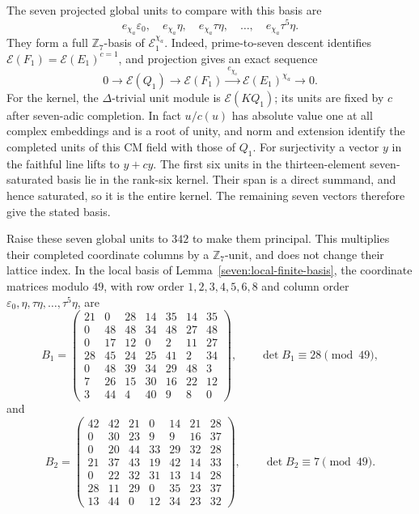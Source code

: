 The seven projected global units to compare with this basis are
\[
 e_{\chi_a}\varepsilon_0,\quad
 e_{\chi_a}\eta,\quad e_{\chi_a}\tau\eta,\quad\ldots,\quad
 e_{\chi_a}\tau^5\eta.
\]
They form a full $\mathbb Z_7$-basis of $\mathcal E_1^{\chi_a}$.
Indeed, prime-to-seven descent identifies
$\mathcal E(F_1)=\mathcal E(E_1)^{c=1}$, and projection gives an exact
sequence
\[
 0\longrightarrow\mathcal E(Q_1)
 \longrightarrow\mathcal E(F_1)
 \xrightarrow{\ e_{\chi_a}\ }\mathcal E(E_1)^{\chi_a}
 \longrightarrow0.
\]
For the kernel, the $\Delta$-trivial unit module is
$\mathcal E(KQ_1)$; its units are fixed by $c$ after seven-adic
completion. In fact $u/c(u)$ has absolute value one at all complex
embeddings and is a root of unity, and norm and extension identify
the completed units of this CM field with those of $Q_1$.
For surjectivity a vector $y$ in the faithful line lifts to $y+cy$.
The first six units in the thirteen-element seven-saturated basis
lie in the rank-six kernel. Their span is a direct summand, and hence
saturated, so it is the entire kernel. The remaining seven vectors
therefore give the stated basis.

Raise these seven global units to $342$ to make them principal.
This multiplies their completed coordinate columns by a
$\mathbb Z_7$-unit, and does not change their lattice index.
In the local basis of Lemma~\ref{seven:local-finite-basis}, the
coordinate matrices modulo $49$, with row order
$1,2,3,4,5,6,8$ and column order
$\varepsilon_0,\eta,\tau\eta,\ldots,\tau^5\eta$, are
\begin{equation*}\tag{U12}\label{seven:local-matrix-one}
 B_1=
 \begin{pmatrix}
 21&0&28&14&35&14&35\\
 0&48&48&34&48&27&48\\
 0&17&12&0&2&11&27\\
 28&45&24&25&41&2&34\\
 0&48&39&34&29&48&3\\
 7&26&15&30&16&22&12\\
 3&44&4&40&9&8&0
 \end{pmatrix},
 \qquad\det B_1\equiv28\pmod{49},
\end{equation*}
and
\begin{equation*}\tag{U13}\label{seven:local-matrix-two}
 B_2=
 \begin{pmatrix}
 42&42&21&0&14&21&28\\
 0&30&23&9&9&16&37\\
 0&20&44&33&29&32&28\\
 21&37&43&19&42&14&33\\
 0&22&32&31&13&14&28\\
 28&11&29&0&35&23&37\\
 13&44&0&12&34&23&32
 \end{pmatrix},
 \qquad\det B_2\equiv7\pmod{49}.
\end{equation*}

